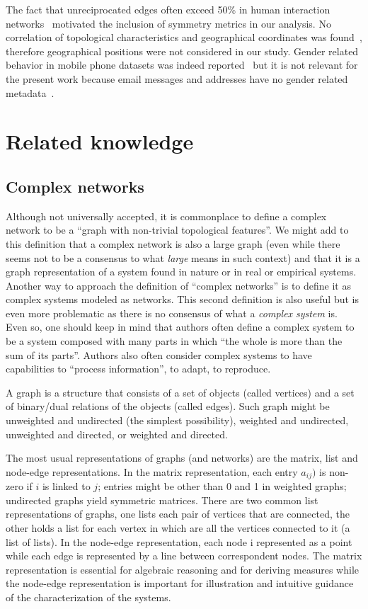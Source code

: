 The fact that unreciprocated edges often exceed 50\% in human interaction networks~\cite{newmanEvolving} motivated the inclusion of symmetry metrics in our analysis.
No correlation of topological characteristics and geographical coordinates was found~\cite{barabasiGeo},
therefore geographical positions were not considered in our study.
Gender related behavior in mobile phone datasets was indeed reported~\cite{barabasiSex}
but it is not relevant for the present work because email messages and addresses have no gender related metadata~\cite{gmanePack}.

\section{Related knowledge}
\subsection{Complex networks}
Although not universally accepted, it is commonplace to define a complex network to be
a ``graph with non-trivial topological features''.
We might add to this definition that a complex network is also a large graph (even while there
seems not to be a consensus to what \emph{large} means in such context)
and that it is a graph representation of a system found in nature or in real or empirical systems.
Another way to approach the definition of ``complex networks'' is to define it as
complex systems modeled as networks.
This second definition is also useful but is even more problematic as
there is no consensus of what a \emph{complex system} is.
Even so, one should keep in mind that authors often define a complex system
to be a system composed with many parts in which ``the whole is more than
the sum of its parts''.
Authors also often consider complex systems to have capabilities
to ``process information'', to adapt, to reproduce. 

A graph is a structure that consists of a set of objects (called vertices)
and a set of binary/dual relations of the objects (called edges).
Such graph might be unweighted and undirected (the simplest possibility),
weighted and undirected, unweighted and directed, or weighted and directed.

The most usual representations of graphs (and networks) are the matrix, list and node-edge representations.
In the matrix representation, each entry $a_{ij})$ is non-zero if $i$ is linked to $j$;
entries might be other than 0 and 1 in weighted graphs; undirected graphs yield symmetric matrices.
There are two common list representations of graphs, one lists each pair of vertices that are connected,
the other holds a list for each vertex in which are all the vertices connected to it (a list of lists).
In the node-edge representation, each node i represented as a point while each edge is represented
by a line between correspondent nodes.
The matrix representation is essential for algebraic reasoning and for deriving measures
while the node-edge representation is important for illustration and intuitive guidance
of the characterization of the systems.

